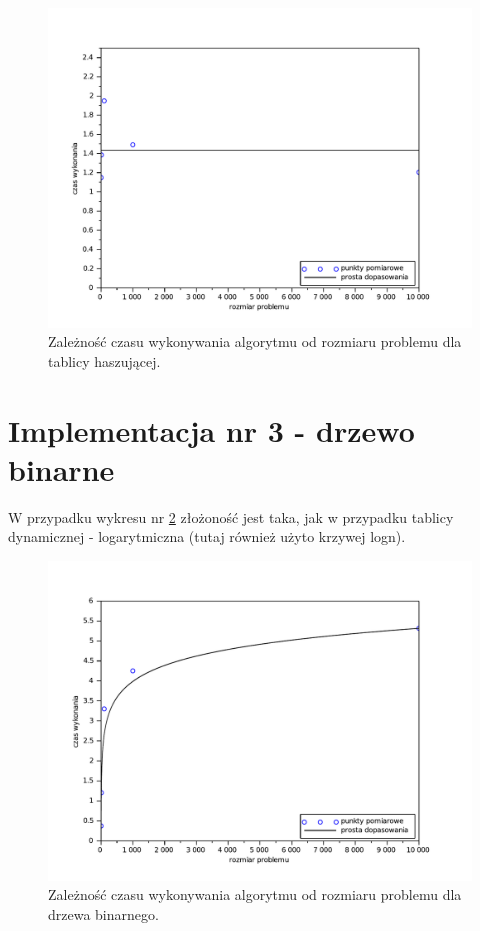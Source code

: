 \documentclass{mwart}
\begin{document}
\begin{figure}[!htp]
\centering
\includegraphics[width=\textwidth]{hash.pdf}
\caption{Zależność czasu wykonywania algorytmu od rozmiaru problemu dla tablicy haszującej. \label{fhash}} 
\end{figure}

\section{Implementacja nr 3 - drzewo binarne}
W przypadku wykresu nr \ref{ftree} złożoność jest taka, jak w przypadku tablicy dynamicznej - logarytmiczna (tutaj również użyto krzywej logn).

\begin{figure}[!htp]
\centering
\includegraphics[width=\textwidth]{tree.pdf}
\caption{Zależność czasu wykonywania algorytmu od rozmiaru problemu dla drzewa binarnego. \label{ftree}} 
\end{figure}
\end{document}
